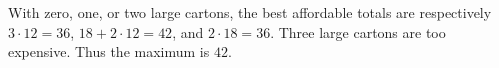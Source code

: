 With zero, one, or two large cartons, the best affordable totals are respectively $3\cdot12=36$, $18+2\cdot12=42$, and $2\cdot18=36$. Three large cartons are too expensive. Thus the maximum is $\boxed{42}$.
